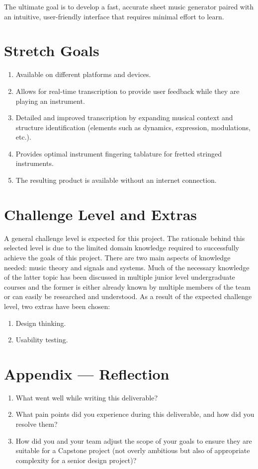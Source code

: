 \documentclass{article}
\begin{document}
The ultimate goal is to develop a fast, accurate sheet music generator paired with an intuitive, user-friendly interface that requires minimal effort to learn.

\section{Stretch Goals}
\begin{enumerate}
    \item Available on different platforms and devices.
    \item Allows for real-time transcription to provide user feedback while they are playing an
    instrument.
    \item Detailed and improved transcription by expanding musical context and
    structure identification (elements such as dynamics, expression, modulations, etc.).
    \item Provides optimal instrument fingering tablature for fretted stringed instruments.
    \item The resulting product is available without an internet connection.
\end{enumerate}

\section{Challenge Level and Extras}
A general challenge level is expected for this project. The rationale behind this selected level is due to
the limited domain knowledge required to successfully achieve the goals of this project. There are two main 
aspects of knowledge needed: music theory and signals and systems. Much of the necessary knowledge of the 
latter topic has been discussed in multiple junior level undergraduate courses and the former is either already
known by multiple members of the team or can easily be researched and understood.
As a result of the expected challenge level, two extras have been chosen:
\begin{enumerate}
    \item Design thinking.
    \item Usability testing.
\end{enumerate}

\newpage{}

\section*{Appendix --- Reflection}




\begin{enumerate}
    \item What went well while writing this deliverable? 
    \item What pain points did you experience during this deliverable, and how
    did you resolve them?
    \item How did you and your team adjust the scope of your goals to ensure
    they are suitable for a Capstone project (not overly ambitious but also of
    appropriate complexity for a senior design project)?
\end{enumerate}  
\end{document}
